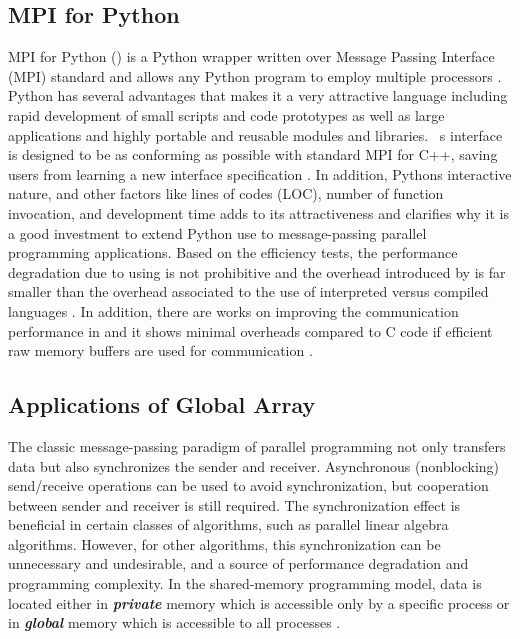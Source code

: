 \label{background}

\subsection{MPI for Python }
MPI for Python () is a Python wrapper written over Message Passing Interface (MPI) standard and allows any Python program to employ multiple processors \cite{Dalcin:2011aa, Dalcin:2005aa}.
Python has several advantages that makes it a very attractive language including rapid development of small scripts and code prototypes as well as large applications and highly portable and reusable modules and libraries.~
\textsc{}s interface is designed to be as conforming as possible with standard MPI for C++, saving users from learning a new interface specification \cite{GAiN}. 
In addition, Python\textsc{}s interactive nature, and other factors like lines of codes (LOC), number of function invocation, and development time adds to its attractiveness and clarifies why it is a good investment to extend Python use to message-passing parallel programming applications.
Based on the efficiency tests, the performance degradation due to using  is not prohibitive and the overhead introduced by  is far smaller than the overhead associated to the use of interpreted versus compiled languages \cite{GAiN}.
In addition, there are works on improving the communication performance in  and it shows minimal overheads compared to C code if efficient raw memory buffers are used for communication \cite{Dalcin:2011aa}.

\subsection{Applications of Global Array}
The classic message-passing paradigm of parallel programming not only transfers data but also synchronizes the sender and receiver. 
Asynchronous (nonblocking) send/receive operations can be used to avoid synchronization, but cooperation between sender and receiver is still required. 
The synchronization effect is beneficial in certain classes of algorithms, such as parallel linear algebra algorithms.
However, for other algorithms, this synchronization can be unnecessary and undesirable, and a source of performance degradation and programming complexity. 
In the shared-memory programming model, data is located either in \textbf{\textit{private}} memory which is accessible only by a specific process or in \textbf{\textit{global}} memory which is accessible to all processes \cite{GA}. 

